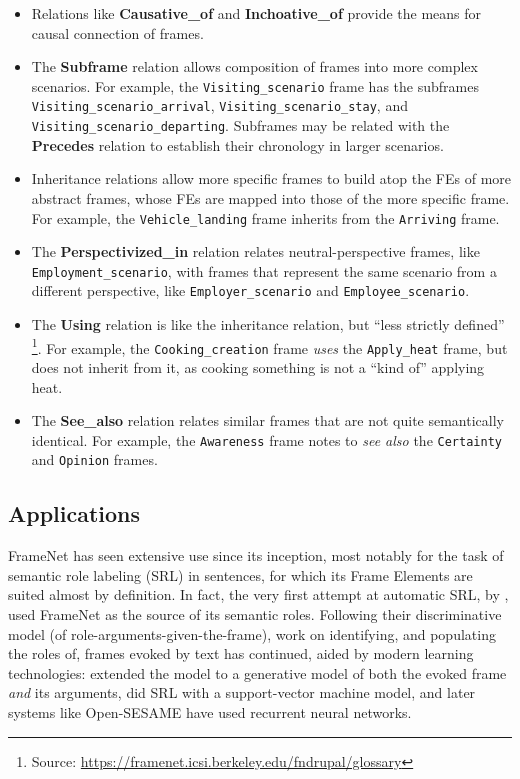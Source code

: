 \begin{itemize}
\item Relations like \textbf{Causative\_of} and \textbf{Inchoative\_of} provide the means for causal connection of frames.

\item The \textbf{Subframe} relation allows composition of frames into more complex scenarios. For example, the \texttt{Visiting\_scenario} frame has the subframes \texttt{Visiting\_scenario\_arrival}, \texttt{Visiting\_scenario\_stay}, and \texttt{Visiting\_scenario\_departing}. Subframes may be related with the \textbf{Precedes} relation to establish their chronology in larger scenarios.

\item Inheritance relations allow more specific frames to build atop the FEs of more abstract frames, whose FEs are mapped into those of the more specific frame. For example, the \texttt{Vehicle\_landing} frame inherits from the \texttt{Arriving} frame.

\item The \textbf{Perspectivized\_in} relation relates neutral-perspective frames, like \texttt{Employment\_scenario}, with frames that represent the same scenario from a different perspective, like \texttt{Employer\_scenario} and \texttt{Employee\_scenario}.

\item The \textbf{Using} relation is like the inheritance relation, but ``less strictly defined'' \footnote{Source: \url{https://framenet.icsi.berkeley.edu/fndrupal/glossary}}. For example, the \texttt{Cooking\_creation} frame \textit{uses} the \texttt{Apply\_heat} frame, but does not inherit from it, as cooking something is not a ``kind of'' applying heat.

\item The \textbf{See\_also} relation relates similar frames that are not quite semantically identical. For example, the \texttt{Awareness} frame notes to \textit{see also} the \texttt{Certainty} and \texttt{Opinion} frames.

\end{itemize}

\subsection{Applications}
\label{sec:srl}
FrameNet has seen extensive use since its inception, most notably for the task of semantic role labeling (SRL) in sentences, for which its Frame Elements are suited almost by definition. In fact, the very first attempt at automatic SRL, by \citet{gildea2002automatic}, used FrameNet as the source of its semantic roles. Following their discriminative model (of role-arguments-given-the-frame), work on identifying, and populating the roles of, frames evoked by text has continued, aided by modern learning technologies: \citet{thompson2003generative} extended the model to a generative model of both the evoked frame \textit{and} its arguments, \citet{giuglea2006semantic} did SRL with a support-vector machine model, and later systems like Open-SESAME \citep{opensesame} have used recurrent neural networks.

